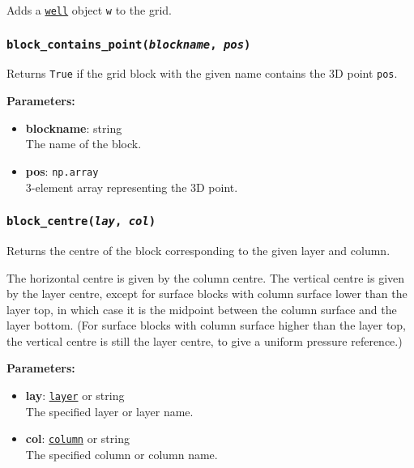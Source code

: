 Adds a \hyperref[wellobjects]{\texttt{well}} object \texttt{w} to the grid.

\begin{snugshade}\subsubsection{\texttt{block\_contains\_point(\emph{blockname}, \emph{pos})}}\end{snugshade}
\label{sec:mulgrid:block_contains_point}

Returns \texttt{True} if the grid block with the given name contains the 3D point \texttt{pos}.

\textbf{Parameters:}
\begin{itemize}
\item \textbf{blockname}: string\\
  The name of the block.
\item \textbf{pos}: \texttt{np.array}\\
  3-element array representing the 3D point.
\end{itemize}

\begin{snugshade}\subsubsection{\texttt{block\_centre(\emph{lay}, \emph{col})}}\end{snugshade}
\label{sec:mulgrid:block_centre}

Returns the centre of the block corresponding to the given layer and column.

The horizontal centre is given by the column centre. The vertical centre is given by the layer centre, except for surface blocks with column surface lower than the layer top, in which case it is the midpoint between the column surface and the layer bottom.  (For surface blocks with column surface higher than the layer top, the vertical centre is still the layer centre, to give a uniform pressure reference.)

\textbf{Parameters:}
\begin{itemize}
\item \textbf{lay}: \hyperref[layerobjects]{\texttt{layer}} or string\\
  The specified layer or layer name.
\item \textbf{col}: \hyperref[columnobjects]{\texttt{column}} or string\\
  The specified column or column name.
\end{itemize}

